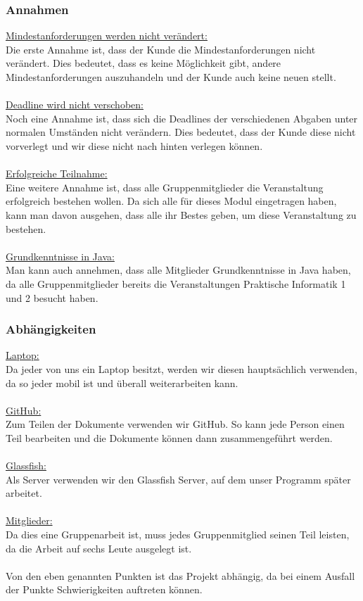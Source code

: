\documentclass[fontsize=12pt,paper=a4,twoside]{scrartcl}
\begin{document}
\subsubsection{Annahmen}
\underline{Mindestanforderungen werden nicht verändert:} \\
Die erste Annahme ist, dass der Kunde die Mindestanforderungen nicht verändert. Dies bedeutet, dass es keine Möglichkeit gibt, andere Mindestanforderungen auszuhandeln und der Kunde auch keine neuen stellt.\\
\bigskip \\
\underline{Deadline wird nicht verschoben:} \\
Noch eine Annahme ist, dass sich die Deadlines der verschiedenen Abgaben unter normalen Umständen nicht verändern. Dies bedeutet, dass der Kunde diese nicht vorverlegt und wir diese nicht nach hinten verlegen können. \\
\bigskip \\
\underline{Erfolgreiche Teilnahme:} \\
Eine weitere Annahme ist, dass alle Gruppenmitglieder die Veranstaltung erfolgreich bestehen wollen. Da sich alle für dieses Modul eingetragen haben, kann man davon ausgehen, dass alle ihr Bestes geben, um diese Veranstaltung zu bestehen.\\
\bigskip \\
\underline{Grundkenntnisse in Java:} \\
Man kann auch annehmen, dass alle Mitglieder Grundkenntnisse in Java haben, da alle Gruppenmitglieder bereits die Veranstaltungen Praktische Informatik 1 und 2 besucht haben.\\

\subsubsection{Abhängigkeiten}

\underline{Laptop:} \\
Da jeder von uns ein Laptop besitzt, werden wir diesen hauptsächlich verwenden, da so jeder mobil ist und überall weiterarbeiten kann.\\
\bigskip \\
\underline{GitHub:} \\
Zum Teilen der Dokumente verwenden wir GitHub. So kann jede Person einen Teil bearbeiten und die Dokumente können dann zusammengeführt werden. \\
\bigskip \\
\underline{Glassfish:} \\
Als Server verwenden wir den Glassfish Server, auf dem unser Programm später arbeitet. \\
\bigskip \\
\underline{Mitglieder:} \\
Da dies eine Gruppenarbeit ist, muss jedes Gruppenmitglied seinen Teil leisten, da die Arbeit auf sechs Leute ausgelegt ist. \\
\bigskip \\
Von den eben genannten Punkten ist das Projekt abhängig, da bei einem Ausfall der Punkte Schwierigkeiten auftreten können.
\end{document}
